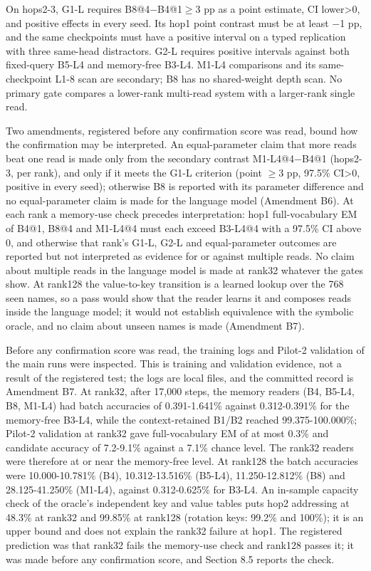 On hops2-3, G1-L requires B8@4\ensuremath{-}B4@1\ensuremath{\geq}3 pp as a point estimate, CI lower>0, and
positive effects in every seed. Its hop1 point contrast must be  %
at least \ensuremath{-}1 pp, and the same checkpoints must have a positive interval on a typed
replication with three same-head distractors. G2-L requires positive  %
intervals against both fixed-query B5-L4 and memory-free B3-L4.  %
M1-L4 comparisons and its same-checkpoint L1-8 scan are secondary; B8 has no
shared-weight depth scan. No primary gate compares a lower-rank  %
multi-read system with a larger-rank single read.  %

Two amendments, registered before any confirmation score was read, bound how the
confirmation may be interpreted. An equal-parameter claim that more reads beat one read is
made only from the secondary contrast M1-L4@4\ensuremath{-}B4@1 (hops2-3, per rank), and only if it meets
the G1-L criterion (point \ensuremath{\geq}3 pp, 97.5\% CI>0, positive in every seed); otherwise B8 is
reported with its parameter difference and no equal-parameter claim is made for the
language model (Amendment B6). At each rank a memory-use check precedes  %
interpretation: hop1 full-vocabulary EM of B4@1, B8@4 and M1-L4@4 must each exceed
B3-L4@4 with a 97.5\% CI above 0, and otherwise that rank’s G1-L, G2-L and equal-parameter
outcomes are reported but not interpreted as evidence for or against multiple reads. No
claim about multiple reads in the language model is made at rank32 whatever the gates show.
At rank128 the value-to-key transition is a learned lookup over the 768 seen names, so a
pass would show that the reader learns it and composes reads inside the language model; it
would not establish equivalence with the symbolic oracle, and no claim about unseen names is
made (Amendment B7).  %

Before any confirmation score was read, the training logs and Pilot-2 validation of the main
runs were inspected. This is training and validation evidence, not a result of the registered
test; the logs are local files, and the committed record is Amendment B7. At rank32, after
17,000 steps, the memory readers (B4, B5-L4, B8, M1-L4) had batch accuracies of
0.391-1.641\% against 0.312-0.391\% for the memory-free B3-L4, while the context-retained
B1/\allowbreak{}B2 reached 99.375-100.000\%; Pilot-2 validation at rank32 gave full-vocabulary EM of at most
0.3\% and candidate accuracy of 7.2-9.1\% against a 7.1\% chance level. The rank32 readers were
therefore at or near the memory-free level. At rank128 the batch accuracies were
10.000-10.781\% (B4), 10.312-13.516\% (B5-L4), 11.250-12.812\% (B8) and 28.125-41.250\% (M1-L4),
against 0.312-0.625\% for B3-L4. An in-sample capacity check of the oracle’s independent key
and value tables puts hop2 addressing at 48.3\% at rank32 and 99.85\% at rank128 (rotation
keys: 99.2\% and 100\%); it is an upper bound and does not explain the rank32 failure at hop1.
The registered prediction was that rank32 fails the memory-use check and rank128 passes it;
it was made before any confirmation score, and Section 8.5 reports the check.  %

